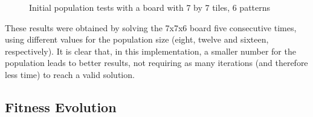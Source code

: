 \documentclass{llncs}
\begin{document}
\begin{figure}[H]
  \centering
  \caption{Initial population tests with a board with 7 by 7 tiles, 6 patterns}
  \label{fig:population_stats}
\end{figure}

These results were obtained by solving the 7x7x6 board five consecutive times, using different values for the population size (eight, twelve and sixteen, respectively). It is clear that, in this implementation, a smaller number for the population leads to better results, not requiring as many iterations (and therefore less time) to reach a valid solution.

\subsection{Fitness Evolution}\label{sec:fitness_evolution}
\end{document}
